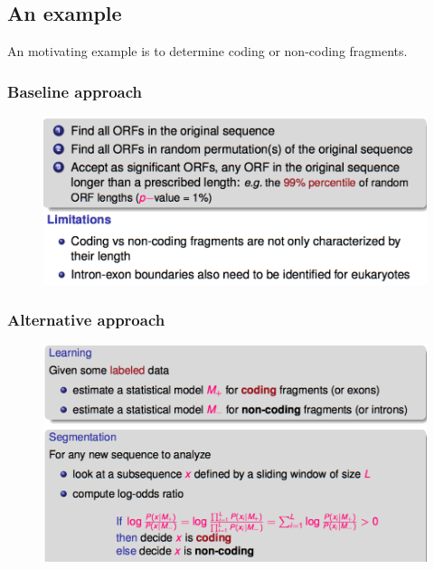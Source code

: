 
\subsection{An example}

An motivating example is to determine coding or non-coding fragments.

\subsubsection{Baseline approach}


\begin{figure}[htp]
	\centering
	\includegraphics[scale=0.5]{images/17_baseline.png}
\end{figure}

\subsubsection{Alternative approach}

\begin{figure}[htp]
	\centering
	\includegraphics[scale=0.4]{images/18_alt.png}
\end{figure}


